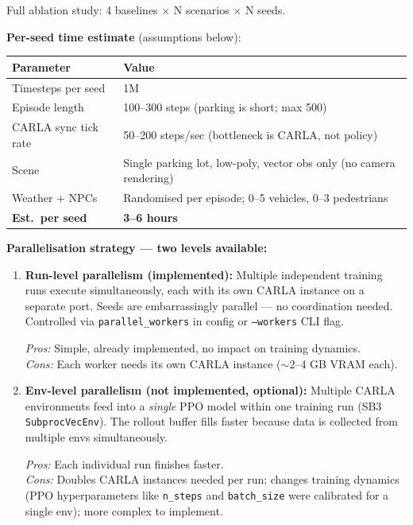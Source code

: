 \documentclass[11pt,a4paper]{article}
\begin{document}
Full ablation study: 4 baselines $\times$ N scenarios $\times$ N seeds.

\textbf{Per-seed time estimate} (assumptions below):

\begin{table}[h]
\centering
\small
\begin{tabular}{@{}ll@{}}
\toprule
\textbf{Parameter} & \textbf{Value} \\
\midrule
Timesteps per seed & 1M \\
Episode length & 100--300 steps (parking is short; max 500) \\
CARLA sync tick rate & 50--200 steps/sec (bottleneck is CARLA, not policy) \\
Scene & Single parking lot, low-poly, vector obs only (no camera rendering) \\
Weather + NPCs & Randomised per episode; 0--5 vehicles, 0--3 pedestrians \\
\midrule
\textbf{Est.\ per seed} & \textbf{3--6 hours} \\
\bottomrule
\end{tabular}
\end{table}

\textbf{Parallelisation strategy --- two levels available:}

\begin{enumerate}[leftmargin=*]
  \item \textbf{Run-level parallelism (implemented):} Multiple independent training runs execute simultaneously, each with its own CARLA instance on a separate port. Seeds are embarrassingly parallel --- no coordination needed. Controlled via \texttt{parallel\_workers} in config or \texttt{--workers} CLI flag.

  \textit{Pros:} Simple, already implemented, no impact on training dynamics.\\
  \textit{Cons:} Each worker needs its own CARLA instance ($\sim$2--4 GB VRAM each).

  \item \textbf{Env-level parallelism (not implemented, optional):} Multiple CARLA environments feed into a \emph{single} PPO model within one training run (SB3 \texttt{SubprocVecEnv}). The rollout buffer fills faster because data is collected from multiple envs simultaneously.

  \textit{Pros:} Each individual run finishes faster.\\
  \textit{Cons:} Doubles CARLA instances needed per run; changes training dynamics (PPO hyperparameters like \texttt{n\_steps} and \texttt{batch\_size} were calibrated for a single env); more complex to implement.
\end{enumerate}
\end{document}
